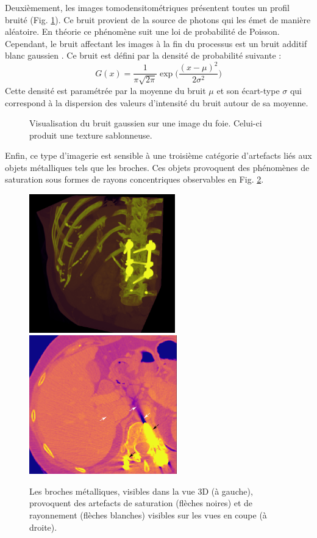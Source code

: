 Deuxièmement, les images tomodensitométriques présentent toutes un profil bruité (Fig. \ref{fig:CT_noise}). Ce bruit provient de la source de photons qui les émet de manière aléatoire. En théorie ce phénomène suit une loi de probabilité de Poisson. Cependant, le bruit affectant les images à la fin du processus est un bruit additif blanc gaussien \cite{Lei1992_gaussianNoiseCT}. Ce bruit est défini par la densité de probabilité suivante :
\begin{equation}
G(x) = \frac{1}{\pi \sqrt{2\pi} } \exp\big( \frac{ (x-\mu)^2}{2\sigma^2} )    
\end{equation}
Cette densité est paramétrée par la moyenne du bruit $\mu$ et son écart-type $\sigma$ qui correspond à la dispersion des valeurs d'intensité du bruit autour de sa moyenne.
\begin{figure}
    \centering
    \caption{Visualisation du bruit gaussien sur une image du foie. Celui-ci produit une texture sablonneuse.}
    \label{fig:CT_noise}
\end{figure}
Enfin, ce type d'imagerie est sensible à une troisième catégorie d'artefacts liés aux objets métalliques tels que les broches. Ces objets provoquent des phénomènes de saturation sous formes de rayons concentriques observables en Fig. \ref{fig:metallic artefacts}.
\begin{figure}
    \centering
    \includegraphics[height=6cm]{Images/broaches_CT.png}
    \includegraphics[height=6cm]{Images/broaches_CT_slice_arrow.png}
    \caption{Les broches métalliques, visibles dans la vue 3D (à gauche), provoquent des artefacts de saturation (flèches noires) et de rayonnement (flèches blanches) visibles sur les vues en coupe (à droite).}
    \label{fig:metallic artefacts}
\end{figure}
